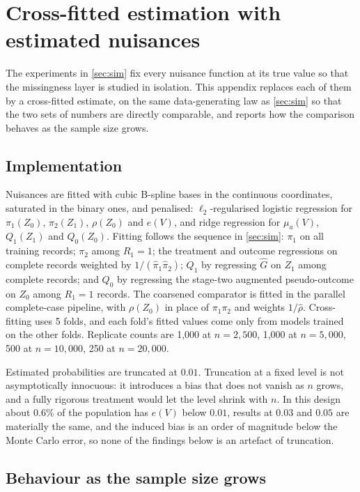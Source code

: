 \section{Cross-fitted estimation with estimated nuisances}\label{app:crossfit}

The experiments in \cref{sec:sim} fix every nuisance function at its true value
so that the missingness layer is studied in isolation. This appendix replaces
each of them by a cross-fitted estimate, on the same data-generating law as
\cref{sec:sim} so that the two sets of numbers are directly comparable, and
reports how the comparison behaves as the sample size grows.

\subsection*{Implementation}

Nuisances are fitted with cubic B-spline bases in the continuous coordinates,
saturated in the binary ones, and penalised: $\ell_2$-regularised logistic
regression for $\pi_1(Z_0)$, $\pi_2(Z_1)$, $\rho(Z_0)$ and $e(V)$, and ridge
regression for $\mu_a(V)$, $Q_1(Z_1)$ and $Q_0(Z_0)$. Fitting follows the
sequence in \cref{sec:sim}: $\pi_1$ on all training records; $\pi_2$ among
$R_1=1$; the treatment and outcome regressions on complete records weighted by
$1/(\widehat\pi_1\widehat\pi_2)$; $Q_1$ by regressing $\widehat G$ on $Z_1$
among complete records; and $Q_0$ by regressing the stage-two augmented
pseudo-outcome on $Z_0$ among $R_1=1$ records. The coarsened comparator is
fitted in the parallel complete-case pipeline, with $\rho(Z_0)$ in place of
$\pi_1\pi_2$ and weights $1/\widehat\rho$. Cross-fitting uses 5
folds, and each fold's fitted values come only from models trained on the other
folds. Replicate counts are 1,000 at $n=2,500$, 1,000 at $n=5,000$, 500 at $n=10,000$, 250 at $n=20,000$.

Estimated probabilities are truncated at $0.01$. Truncation at a fixed level is
not asymptotically innocuous: it introduces a bias that does not vanish as $n$
grows, and a fully rigorous treatment would let the level shrink with $n$. In
this design about $0.6\%$ of the population has $e(V)$ below $0.01$, results at
$0.03$ and $0.05$ are materially the same, and the induced bias is an order of
magnitude below the Monte Carlo error, so none of the findings below is an
artefact of truncation.

\subsection*{Behaviour as the sample size grows}

